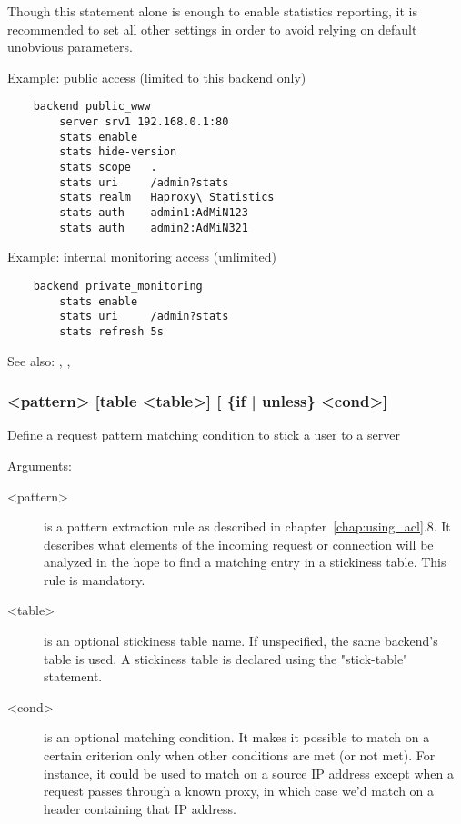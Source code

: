 {  Though this statement alone is enough to enable statistics reporting, it is
  recommended to set all other settings in order to avoid relying on default
  unobvious parameters.

  Example: public access (limited to this backend only)
  \begin{verbatim}
    backend public_www
        server srv1 192.168.0.1:80
        stats enable
        stats hide-version
        stats scope   .
        stats uri     /admin?stats
        stats realm   Haproxy\ Statistics
        stats auth    admin1:AdMiN123
        stats auth    admin2:AdMiN321
  \end{verbatim}

  Example: internal monitoring access (unlimited)
  \begin{verbatim}
    backend private_monitoring
        stats enable
        stats uri     /admin?stats
        stats refresh 5s
  \end{verbatim}

  See also: , , 

\subsubsection[stick match]{ <pattern> [table <table>] [ \{if | unless\} <cond>]}

  Define a request pattern matching condition to stick a user to a server


  Arguments:
  \begin{description}
  \item[<pattern>] is a pattern extraction rule as described in chapter~\ref{chap:using_acl}.8. It
               describes what elements of the incoming request or connection
               will be analyzed in the hope to find a matching entry in a
               stickiness table. This rule is mandatory.

  \item[<table>] is an optional stickiness table name. If unspecified, the same
               backend's table is used. A stickiness table is declared using
               the "stick-table" statement.

  \item[<cond>] is an optional matching condition. It makes it possible to match
               on a certain criterion only when other conditions are met (or
               not met). For instance, it could be used to match on a source IP
               address except when a request passes through a known proxy, in
               which case we'd match on a header containing that IP address.
  \end{description}

}
